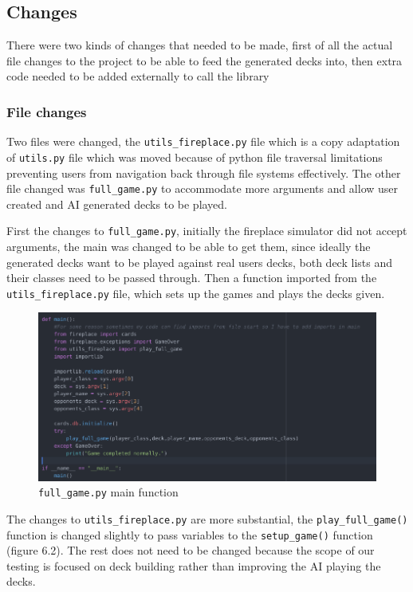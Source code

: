 \documentclass{report} %
\begin{document}
\subsection{Changes}
There were two kinds of changes that needed to be made, first of all the actual file changes to the project to be able to feed the generated decks into, then extra code needed to be added externally to call the library
\subsubsection{File changes}
Two files were changed, the \nolinkurl{utils_fireplace.py} file which is a copy adaptation of \nolinkurl{utils.py} file which was moved because of python file traversal limitations preventing users from navigation back through file systems effectively. The other file changed was \nolinkurl{full_game.py} to accommodate more arguments and allow user created and AI generated decks to be played.

First the changes to \nolinkurl{full_game.py}, initially the fireplace simulator did not accept arguments, the main was changed to be able to get them, since ideally the generated decks want to be played against real users decks, both deck lists and their classes need to be passed through. Then a function imported from the \nolinkurl{utils_fireplace.py} file, which sets up the games and plays the decks given.

\begin{figure}[H]
\centering
\includegraphics[width=1.25\textwidth]{simMain}
\caption{\nolinkurl{full_game.py} main function \protect}
\label{board}
\end{figure}

The changes to \nolinkurl{utils_fireplace.py} are more substantial, the \nolinkurl{play_full_game()} function is changed slightly to pass variables to the \nolinkurl{setup_game()} function (figure 6.2). The rest does not need to be changed because the scope of our testing is focused on deck building rather than improving the AI playing the decks.
\end{document}
